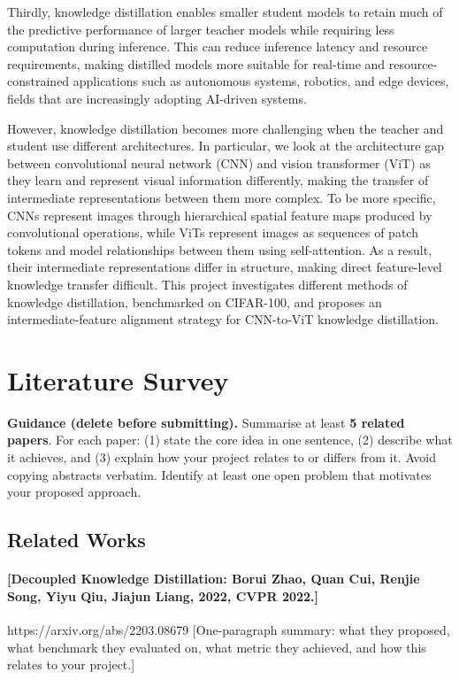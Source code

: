 \documentclass[11pt, letterpaper]{article}
\begin{document}
Thirdly, knowledge distillation enables smaller student models to retain much of the predictive performance of larger teacher models while requiring less computation during inference. This can reduce inference latency and resource requirements, making distilled models more suitable for real-time and resource-constrained applications such as autonomous systems, robotics, and edge devices, fields that are increasingly adopting AI-driven systems. 

However, knowledge distillation becomes more challenging when the teacher and student use different architectures. In particular, we look at the architecture gap between convolutional neural network (CNN) and vision transformer (ViT) as they learn and represent visual information differently, making the transfer of intermediate representations between them more complex. To be more specific, CNNs represent images through hierarchical spatial feature maps produced by convolutional operations, while ViTs represent images as sequences of patch tokens and model relationships between them using self-attention. As a result, their intermediate representations differ in structure, making direct feature-level knowledge transfer difficult. This project investigates different methods of knowledge distillation, benchmarked on CIFAR-100, and proposes an intermediate-feature alignment strategy for CNN-to-ViT knowledge distillation. 
\section{Literature Survey}

\begin{guidancebox}
\textbf{Guidance (delete before submitting).}
Summarise at least \textbf{5 related papers}. For each paper:
(1) state the core idea in one sentence, (2) describe what it achieves,
and (3) explain how your project relates to or differs from it.
Avoid copying abstracts verbatim. Identify at least one open problem
that motivates your proposed approach.
\end{guidancebox}

\subsection{Related Works}

\paragraph{[Decoupled Knowledge Distillation: Borui Zhao, Quan Cui, Renjie Song, Yiyu Qiu, Jiajun Liang, 2022, CVPR 2022.]}
https://arxiv.org/abs/2203.08679
[One-paragraph summary: what they proposed, what benchmark they evaluated on,
what metric they achieved, and how this relates to your project.]
\end{document}
